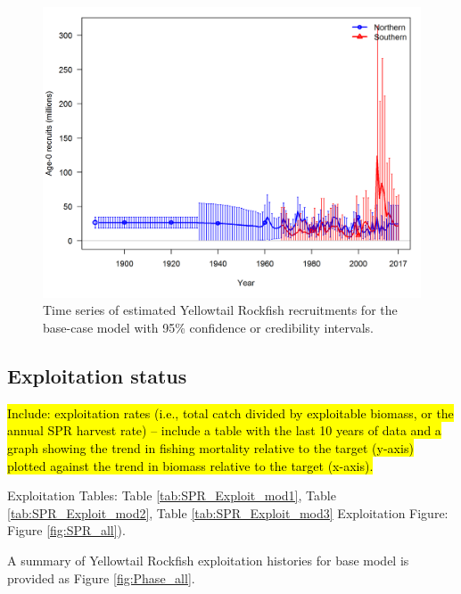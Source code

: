 \documentclass[12pt,]{article}
\begin{document}
\FloatBarrier

\begin{figure}[htbp]
\centering
\includegraphics{r4ss/plots_compare/base_compare8_recruits_uncertainty.png}
\caption{Time series of estimated Yellowtail Rockfish recruitments for
the base-case model with 95\% confidence or credibility intervals.
\label{fig:Recruits_all}}
\end{figure}

\FloatBarrier

\subsection*{Exploitation status}\label{exploitation-status}

\hl{Include: exploitation rates (i.e., total catch divided by exploitable biomass, or the annual SPR harvest rate) – include a table with the last 10 years of data and a graph showing the trend in fishing mortality relative to the target (y-axis) plotted against the trend in biomass relative to the target (x-axis).}

Exploitation Tables: Table \ref{tab:SPR_Exploit_mod1}, Table
\ref{tab:SPR_Exploit_mod2}, Table \ref{tab:SPR_Exploit_mod3}
Exploitation Figure: Figure \ref{fig:SPR_all}).

A summary of Yellowtail Rockfish exploitation histories for base model
is provided as Figure \ref{fig:Phase_all}.

\FloatBarrier
\end{document}
